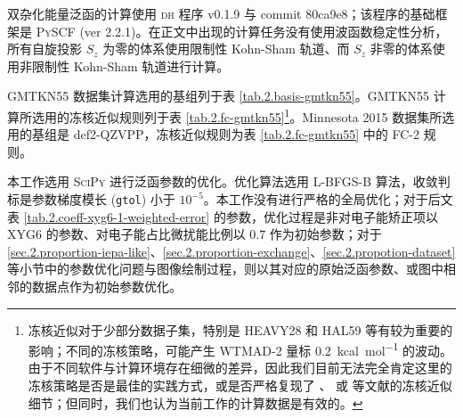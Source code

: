 双杂化能量泛函的计算使用 \textsc{dh} 程序 v0.1.9 与 commit 80ca9e8；该程序的基础框架是 \textsc{PySCF} (ver 2.2.1)。在正文中出现的计算任务没有使用波函数稳定性分析，所有自旋投影 $S_z$ 为零的体系使用限制性 Kohn-Sham 轨道、而 $S_z$ 非零的体系使用非限制性 Kohn-Sham 轨道进行计算。

GMTKN55 数据集计算选用的基组列于表 \ref{tab.2.basis-gmtkn55}。GMTKN55 计算所选用的冻核近似规则列于表 \ref{tab.2.fc-gmtkn55}\footnote{冻核近似对于少部分数据子集，特别是 HEAVY28 和 HAL59 等有较为重要的影响；不同的冻核策略，可能产生 WTMAD-2 量标 \SI{0.2}{kcal.mol^{-1}} 的波动\cite{Santra-Martin.JPCA.2019}。由于不同软件与计算环境存在细微的差异，因此我们目前无法完全肯定这里的冻核策略是否是最佳的实践方式，或是否严格复现了 、 或  等文献的冻核近似细节；但同时，我们也认为当前工作的计算数据是有效的。}。Minnesota 2015 数据集所选用的基组是 def2-QZVPP，冻核近似规则为表 \ref{tab.2.fc-gmtkn55} 中的 FC-2 规则。

本工作选用 \textsc{SciPy} 进行泛函参数的优化。优化算法选用 L-BFGS-B 算法\cite{Byrd-Zhu.SJSC.1995}，收敛判标是参数梯度模长 (\verb|gtol|) 小于 $10^{-5}$。本工作没有进行严格的全局优化；对于后文表 \ref{tab.2.coeff-xyg6-1-weighted-error} 的参数，优化过程是非对电子能矫正项以 XYG6 的参数、对电子能占比微扰能比例以 0.7 作为初始参数；对于 \ref{sec.2.proportion-iepa-like}、\ref{sec.2.proportion-exchange}、\ref{sec.2.propotion-dataset} 等小节中的参数优化问题与图像绘制过程，则以其对应的原始泛函参数、或图中相邻的数据点作为初始参数优化。


